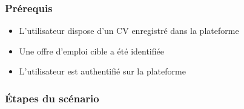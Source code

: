\subsubsection*{Prérequis}
\begin{itemize}
    \item L'utilisateur dispose d'un CV enregistré dans la plateforme
    \item Une offre d'emploi cible a été identifiée
    \item L'utilisateur est authentifié sur la plateforme
\end{itemize}

\subsubsection*{Étapes du scénario}


